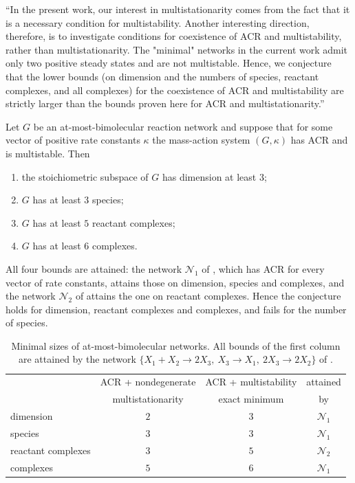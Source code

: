 \documentclass[11pt,a4paper]{report}
\begin{document}
\begin{openquote}
``In the present work, our interest in multistationarity comes from the fact that it is a necessary condition for
multistability. Another interesting direction, therefore, is to investigate conditions for coexistence of ACR and
multistability, rather than multistationarity. The "minimal" networks in the current work admit only two positive
steady states and are not multistable. Hence, we conjecture that the lower bounds (on dimension and the numbers of
species, reactant complexes, and all complexes) for the coexistence of ACR and multistability are strictly larger
than the bounds proven here for ACR and multistationarity.''
\end{openquote}

\begin{theorem}\label{thm:main}
Let $G$ be an at-most-bimolecular reaction network and suppose that for some vector of positive rate constants
$\kappa$ the mass-action system $(G,\kappa)$ has ACR and is multistable. Then
\begin{enumerate}
\item the stoichiometric subspace of $G$ has dimension at least $3$;
\item $G$ has at least $3$ species;
\item $G$ has at least $5$ reactant complexes;
\item $G$ has at least $6$ complexes.
\end{enumerate}
All four bounds are attained: the network $\mathcal N_1$ of , which has ACR for every
vector of rate constants, attains those on dimension, species and complexes, and the network $\mathcal N_2$ of
 attains the one on reactant complexes. Hence the conjecture holds for dimension, reactant complexes
and complexes, and fails for the number of species.
\end{theorem}

\begin{table}[ht]
\centering
\begin{tabular}{lccc}
\toprule
& ACR + nondegenerate & ACR + multistability & attained\\
& multistationarity \autocite{KNS2024} & exact minimum & by\\
\midrule
dimension & $2$ & $3$ & $\mathcal N_1$\\
species & $3$ & $3$ & $\mathcal N_1$\\
reactant complexes & $3$ & $5$ & $\mathcal N_2$\\
complexes & $5$ & $6$ & $\mathcal N_1$\\
\bottomrule
\end{tabular}
\caption{Minimal sizes of at-most-bimolecular networks. All bounds of the first column are attained by the network
$\{X_1+X_2\to2X_3,\ X_3\to X_1,\ 2X_3\to2X_2\}$ of \autocite{KNS2024}.}
\label{tab:summary}
\end{table}
\end{document}
